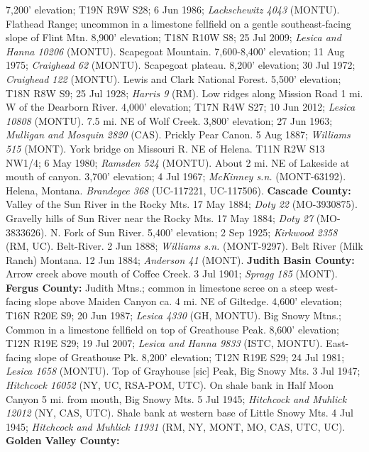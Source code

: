 7,200' elevation; T19N R9W S28; 6 Jun 1986; \textit{Lackschewitz 4043} (MONTU).
Flathead Range; uncommon in a limestone fellfield on a gentle southeast-facing
slope of Flint Mtn. 8,900' elevation; T18N R10W S8; 25 Jul 2009;
\textit{Lesica and Hanna 10206} (MONTU).
Scapegoat Mountain. 7,600-8,400' elevation; 11 Aug 1975;
\textit{Craighead 62} (MONTU).
Scapegoat plateau. 8,200' elevation; 30 Jul 1972;
\textit{Craighead 122} (MONTU).
Lewis and Clark National Forest. 5,500' elevation; T18N R8W S9; 25 Jul 1928;
\textit{Harris 9} (RM).
Low ridges along Mission Road 1 mi. W of the Dearborn River. 4,000' elevation;
T17N R4W S27; 10 Jun 2012; \textit{Lesica 10808} (MONTU).
7.5 mi. NE of Wolf Creek. 3,800' elevation; 27 Jun 1963;
\textit{Mulligan and Mosquin 2820} (CAS).
Prickly Pear Canon. 5 Aug 1887; \textit{Williams 515} (MONT).
York bridge on Missouri R. NE of Helena. T11N R2W S13 NW1/4; 6 May 1980;
\textit{Ramsden 524} (MONTU).
About 2 mi. NE of Lakeside at mouth of canyon. 3,700' elevation; 4 Jul 1967;
\textit{McKinney s.n.} (MONT-63192).
Helena, Montana. \textit{Brandegee 368} (UC-117221, UC-117506).
  \textbf{Cascade County:}
Valley of the Sun River in the Rocky Mts. 17 May 1884;
\textit{Doty 22} (MO-3930875).
Gravelly hills of Sun River near the Rocky Mts. 17 May 1884;
\textit{Doty 27} (MO-3833626).
N. Fork of Sun River. 5,400' elevation; 2 Sep 1925;
\textit{Kirkwood 2358} (RM, UC).
Belt-River. 2 Jun 1888; \textit{Williams s.n.} (MONT-9297).
Belt River (Milk Ranch) Montana. 12 Jun 1884; \textit{Anderson 41} (MONT).
  \textbf{Judith Basin County:}
Arrow creek above mouth of Coffee Creek. 3 Jul 1901; \textit{Spragg 185} (MONT).
  \textbf{Fergus County:}
Judith Mtns.; common in limestone scree on a steep west-facing slope above
Maiden Canyon ca. 4 mi. NE of Giltedge. 4,600' elevation; T16N R20E S9;
20 Jun 1987; \textit{Lesica 4330} (GH, MONTU).
Big Snowy Mtns.; Common in a limestone fellfield on top of Greathouse Peak.
8,600' elevation; T12N R19E S29; 19 Jul 2007;
\textit{Lesica and Hanna 9833} (ISTC, MONTU).
East-facing slope of Greathouse Pk. 8,200' elevation; T12N R19E S29;
24 Jul 1981; \textit{Lesica 1658} (MONTU).
Top of Grayhouse [sic] Peak, Big Snowy Mts. 3 Jul 1947;
\textit{Hitchcock 16052} (NY, UC, RSA-POM, UTC).
On shale bank in Half Moon Canyon 5 mi. from mouth, Big Snowy Mts. 5 Jul 1945;
\textit{Hitchcock and Muhlick 12012} (NY, CAS, UTC).
Shale bank at western base of Little Snowy Mts. 4 Jul 1945;
\textit{Hitchcock and Muhlick 11931} (RM, NY, MONT, MO, CAS, UTC, UC).
  \textbf{Golden Valley County:}
